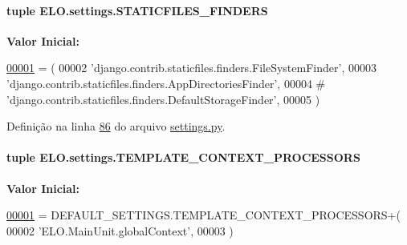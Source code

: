 \hypertarget{namespaceELO_1_1settings_a3e4decd51fab7bd5bdbdb12aac13b70a}{
\paragraph[{S\-T\-A\-T\-I\-C\-F\-I\-L\-E\-S\-\_\-\-F\-I\-N\-D\-E\-R\-S}]{\setlength{\rightskip}{0pt plus 5cm}tuple E\-L\-O.\-settings.\-S\-T\-A\-T\-I\-C\-F\-I\-L\-E\-S\-\_\-\-F\-I\-N\-D\-E\-R\-S}}\label{namespaceELO_1_1settings_a3e4decd51fab7bd5bdbdb12aac13b70a}
{\bfseries Valor Inicial\-:}
\begin{DoxyCode}
\hypertarget{namespaceELO_1_1settings_l00001}{}\hyperlink{namespaceELO_1_1settings}{00001} = (
00002     \textcolor{stringliteral}{'django.contrib.staticfiles.finders.FileSystemFinder'},
00003     \textcolor{stringliteral}{'django.contrib.staticfiles.finders.AppDirectoriesFinder'},
00004 \textcolor{comment}{#    'django.contrib.staticfiles.finders.DefaultStorageFinder',}
00005 )
\end{DoxyCode}


Definição na linha \hyperlink{settings_8py_source_l00086}{86} do arquivo \hyperlink{settings_8py_source}{settings.\-py}.

\hypertarget{namespaceELO_1_1settings_ad62b51880946e9380913c2f3811311bf}{
\paragraph[{T\-E\-M\-P\-L\-A\-T\-E\-\_\-\-C\-O\-N\-T\-E\-X\-T\-\_\-\-P\-R\-O\-C\-E\-S\-S\-O\-R\-S}]{\setlength{\rightskip}{0pt plus 5cm}tuple E\-L\-O.\-settings.\-T\-E\-M\-P\-L\-A\-T\-E\-\_\-\-C\-O\-N\-T\-E\-X\-T\-\_\-\-P\-R\-O\-C\-E\-S\-S\-O\-R\-S}}\label{namespaceELO_1_1settings_ad62b51880946e9380913c2f3811311bf}
{\bfseries Valor Inicial\-:}
\begin{DoxyCode}
\hypertarget{namespaceELO_1_1settings_l00001}{}\hyperlink{namespaceELO_1_1settings}{00001} = DEFAULT\_SETTINGS.TEMPLATE\_CONTEXT\_PROCESSORS+(
00002     \textcolor{stringliteral}{'ELO.MainUnit.globalContext'},
00003 )
\end{DoxyCode}


